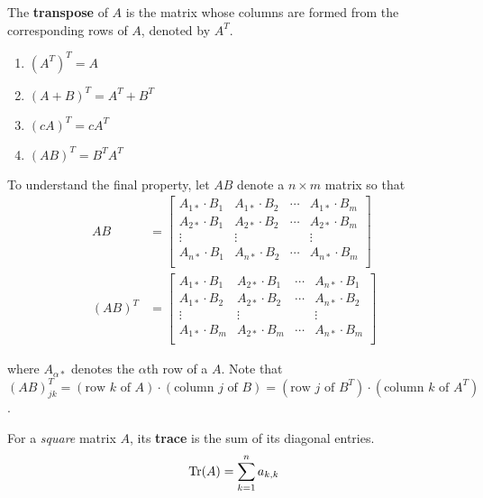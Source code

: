 \begin{definition}
The \textbf{transpose} of $A$ is the matrix whose columns are formed from the corresponding rows of $A$, denoted by $A^T$. 
\begin{enumerate}
	\item $(A^T)^T = A$
	\item $(A + B)^T = A^T + B^T$
	\item $(cA)^T = cA^T$
	\item $(AB)^T = B^T A^T$
\end{enumerate}

To understand the final property, let $AB$ denote a $n \times m$ matrix so that 
$$
\begin{aligned}
AB &= \begin{bmatrix}
A_{1*} \cdot B_{1} & A_{1*} \cdot B_{2} & \cdots & A_{1*} \cdot B_{m} \\
A_{2*} \cdot B_{1} & A_{2*} \cdot B_{2} & \cdots & A_{2*} \cdot B_{m} \\
\vdots & \vdots &  & \vdots \\
A_{n*} \cdot B_{1} & A_{n*} \cdot B_{2} & \cdots & A_{n*} \cdot B_{m} \\
\end{bmatrix} \\
(AB)^{T} &= \begin{bmatrix}
A_{1*} \cdot B_{1} & A_{2*} \cdot B_{1} & \cdots & A_{n*} \cdot B_{1} \\
A_{1*} \cdot B_{2} & A_{2*} \cdot B_{2} & \cdots & A_{n*} \cdot B_{2} \\
\vdots & \vdots &  & \vdots \\
A_{1*} \cdot B_{m} & A_{2*} \cdot B_{m} & \cdots & A_{n*} \cdot B_{m} \\

\end{bmatrix}
\end{aligned}
$$

where $A_{\alpha *}$ denotes the $\alpha$th row of a $A$. Note that $(AB)^{T}_{jk} = (\text{row $k$ of $A$}) \cdot (\text{column $j$ of $B$}) = (\text{row $j$ of $B^{T}$}) \cdot (\text{column $k$ of $A^{T}$}) $. 

\end{definition}

\begin{definition}
For a \textit{square} matrix $A$, its \textbf{trace} is the sum of its diagonal entries. 
$$\Trace(A) = \sum_{k=1}^{n} a_{k, k}$$
\end{definition}

